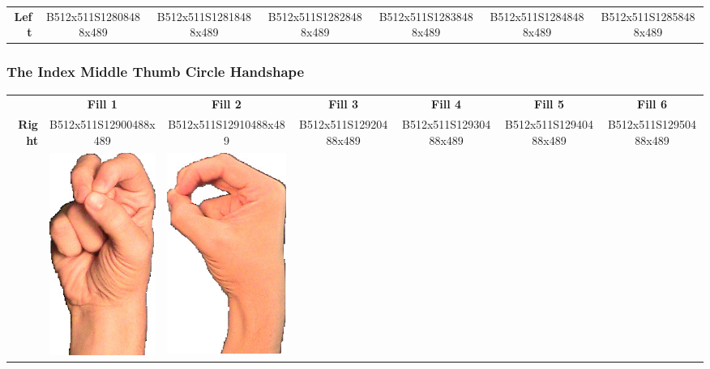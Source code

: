 \documentclass{article}
\begin{document}
\begin{center}
\begin{tabular}{r*{6}{c}}
\textbf{Left}&
B512x511S12808488x489&
B512x511S12818488x489&
B512x511S12828488x489&
B512x511S12838488x489&
B512x511S12848488x489&
B512x511S12858488x489\\
\end{tabular}
\end{center}

\subsubsection{The Index Middle Thumb Circle Handshape}

\begin{center}
\begin{tabular}{r*{6}{c}}
&\textbf{Fill 1}&\textbf{Fill 2}&\textbf{Fill 3}&\textbf{Fill 4}&\textbf{Fill 5}&\textbf{Fill 6}\\
\multirow{2}{*}{\textbf{Right}}&
B512x511S12900488x489&
B512x511S12910488x489&
B512x511S12920488x489&
B512x511S12930488x489&
B512x511S12940488x489&
B512x511S12950488x489\\
&
\includegraphics[scale=0.1]{images/03-06-1.jpg}&
\includegraphics[scale=0.1]{images/03-06-2.jpg}&

\end{tabular}
\end{center}
\end{document}
